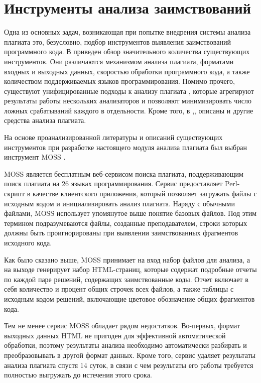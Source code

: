 \documentclass[a4paper,14pt]{extarticle}
\begin{document}
\section{Инструменты анализа заимствований}

Одна из основных задач, возникающая при попытке внедрения системы анализа плагиата это, безусловно, подбор инструментов выявления заимствований программного кода. В \citep{plagiarismToolsSurvey} приведен обзор значительного количества существующих инструментов. Они различаются механизмом анализа плагиата, форматами входных и выходных данных, скоростью обработки программного кода, а также количеством поддерживаемых языков программирования. Помимо прочего, существуют унифицированные подходы к анализу плагиата \citep{unifiedPlagiarismDetectionTool}\citep{gitplagThesis}, которые агрегируют результаты работы нескольких анализаторов и позволяют минимизировать число ложных срабатываний каждого в отдельности. Кроме того, в \citep{codeStyleDetectionTool},\citep{anotherPlagAnalysisTool},\citep{languageIndependentPlagiarismTool} описаны и другие средства анализа плагиата.

На основе проанализированной литературы и описаний существующих инструментов при разработке настоящего модуля анализа плагиата был выбран инструмент MOSS \citep{mossOriginalPaper}.

MOSS является бесплатным веб-сервисом поиска плагиата, поддерживающим поиск плагиата на 26 языках программирования. Сервис предоставляет Perl-скрипт в качестве клиентского приложения, который позволяет загружать файлы с исходным кодом и инициализировать анализ плагиата. Наряду с обычными файлами, MOSS использует упомянутое выше понятие базовых файлов. Под этим термином подразумеваются файлы, созданные преподавателем, строки которых должны быть проигнорированы при выявлении заимствованных фрагментов исходного кода.

Как было сказано выше, MOSS принимает на вход набор файлов для анализа, а на выходе генерирует набор HTML-страниц, которые содержат подробные отчеты по каждой паре решений, содержащих заимствованные коды. Отчет включает в себя количество и процент общих строчек всех файлов, а также таблицы с исходным кодом решений, включающие цветовое обозначение общих фрагментов кода. 

Тем не менее сервис MOSS обладает рядом недостатков. Во-первых, формат выходных данных HTML не пригоден для эффективной автоматической обработки, поэтому результаты анализа необходимо автоматически разбирать и преобразовывать в другой формат данных. Кроме того, сервис удаляет результаты анализа плагиата спустя 14 суток, в связи с чем результаты его работы требуется полностью выгружать до истечения этого срока.
\end{document}
